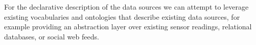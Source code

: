 For the declarative description of the data sources we can attempt to leverage existing vocabularies and ontologies that
describe existing data sources, for example providing an abstraction layer over existing sensor readings, relational
databases, or social web feeds.


